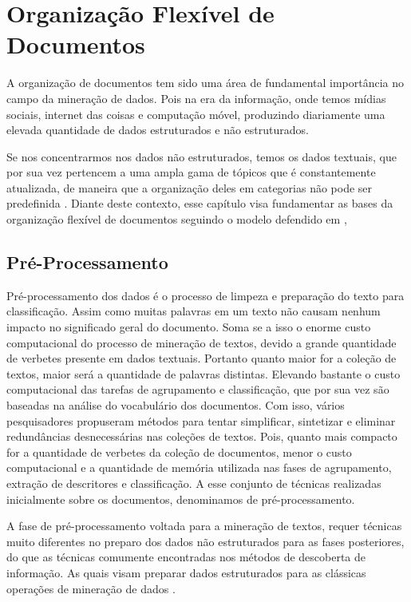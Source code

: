 \section{Organização Flexível de Documentos}

A organização de documentos tem sido uma área de fundamental importância no campo da
mineração de dados. Pois na era da informação, onde temos mídias sociais, internet das coisas
e computação móvel, produzindo diariamente uma elevada quantidade de dados estruturados e 
não estruturados. 

Se nos concentrarmos nos dados não estruturados, temos os dados textuais,
que por sua vez pertencem a uma ampla gama de tópicos que é constantemente atualizada, de maneira
que a organização deles em categorias não pode ser predefinida \cite{Carvalho2016}. 
Diante deste contexto, esse capítulo visa fundamentar as bases da organização flexível de documentos 
seguindo o modelo defendido em \cite{Nogueira2013},


\subsection{Pré-Processamento}
Pré-processamento dos dados é o processo de limpeza e preparação do texto para classificação.
Assim como muitas palavras em um texto não causam nenhum impacto no significado geral do documento\cite{Haddi2013}.
Soma se a isso o enorme custo computacional do processo de mineração de textos, devido a grande quantidade de verbetes presente em dados textuais. 
Portanto quanto maior for a coleção de textos, maior será a quantidade de palavras distintas. 
Elevando bastante o custo computacional das tarefas de agrupamento e classificação, 
que por sua vez são baseadas na análise do vocabulário dos documentos. 
Com isso, vários pesquisadores propuseram métodos para tentar simplificar, sintetizar e eliminar redundâncias desnecessárias nas coleções de textos.
Pois, quanto mais compacto for a quantidade de verbetes da coleção de documentos, menor o custo
computacional e a quantidade de memória utilizada nas fases de agrupamento, extração de descritores
e classificação. A esse conjunto de técnicas realizadas inicialmente sobre os documentos, 
denominamos de pré-processamento. 

A fase de pré-processamento voltada para a mineração de textos, requer técnicas muito diferentes
no preparo dos dados não estruturados para as fases posteriores, do que as técnicas comumente
encontradas nos métodos de descoberta de informação. As quais visam preparar dados estruturados para
as clássicas operações de mineração de dados \cite{Feldman2007}.

